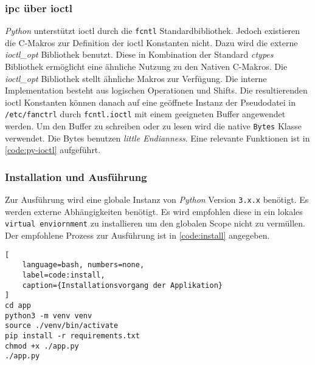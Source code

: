 \subsubsection{\acrshort{ipc} über \acrshort{ioctl}}

\textit{Python} unterstützt \gls{ioctl} durch die \texttt{fcntl} Standardbibliothek.
Jedoch existieren die C-Makros zur Definition der \gls{ioctl} Konstanten nicht.
Dazu wird die externe \textit{ioctl\_opt}\cite{ioctl} Bibliothek benutzt.
Diese in Kombination der Standard \textit{ctypes} Bibliothek ermöglicht eine ähnliche Nutzung zu den Nativen C-Makros.
Die \textit{ioctl\_opt} Bibliothek stellt ähnliche Makros zur Verfügung.
Die interne Implementation besteht aus logischen Operationen und Shifts.
Die resultierenden \gls{ioctl} Konstanten können danach auf eine geöffnete Instanz der Pseudodatei in \texttt{/etc/fanctrl} durch \texttt{fcntl.ioctl} mit einem geeigneten Buffer angewendet werden.
Um den Buffer zu schreiben oder zu lesen wird die native \texttt{Bytes} Klasse verwendet.
Die Bytes benutzen \textit{little Endianness}.
Eine relevante Funktionen ist in \autoref{code:py-ioctl} aufgeführt.



\subsubsection{Installation und Ausführung}

Zur Ausführung wird eine globale Instanz von \textit{Python} Version \texttt{3.x.x} benötigt.
Es werden externe Abhängigkeiten benötigt.
Es wird empfohlen diese in ein lokales \texttt{virtual enviornment} zu installieren um den globalen Scope nicht zu vermüllen.
Der empfohlene Prozess zur Ausführung ist in \autoref{code:install} angegeben.

\begin{lstlisting}[
    language=bash, numbers=none,
    label=code:install,
    caption={Installationsvorgang der Applikation}
]
cd app
python3 -m venv venv
source ./venv/bin/activate
pip install -r requirements.txt
chmod +x ./app.py
./app.py
\end{lstlisting}
